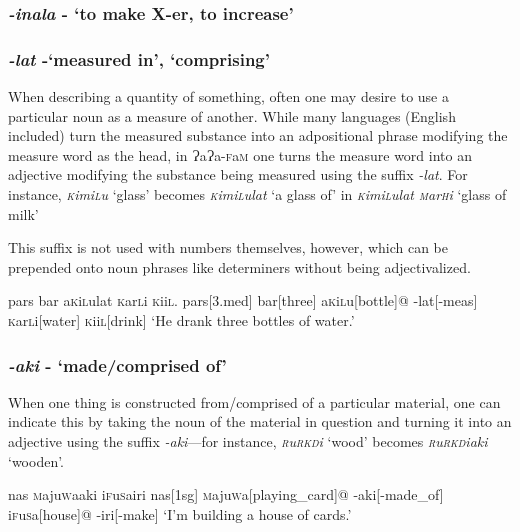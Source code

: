 \documentclass[a4paper,10pt,twoside,openright]{memoir}
\newcommand{\lang}{{\bigglot}a{\bigglot}a-\textsc{f}a\textsc{m}}
\newcommand{\bigglot}{Ɂ}
\newcommand{\famwordold}[5]{#1\textsc{#2}#3\textsc{#4}#5}
\begin{document}
\subsubsection{\emph{-inala} - `to make X-er, to increase'}

\subsubsection{\emph{-lat} -`measured in', `comprising'}

When describing a quantity of something, often one may desire to use a particular noun as a measure of another. While many languages (English included) turn the measured substance into an adpositional phrase modifying the measure word as the head, in \lang{} one turns the measure word into an adjective modifying the substance being measured using the suffix \emph{-lat}. For instance, \emph{\famwordold{}{k}{imi}{l}{u}} `glass' becomes \emph{\famwordold{}{k}{imi}{l}{ulat}} `a glass of' in \emph{\famwordold{}{k}{imi}{l}{ulat} \famwordold{}{m}{ar}{h}{i}} `glass of milk'

This suffix is not used with numbers themselves, however, which can be prepended onto noun phrases like determiners without being adjectivalized.

\ex
\begingl
\glpreamble
pars bar \famwordold{a}{k}{i}{l}{ulat} \famwordold{}{k}{ar}{l}{i} \famwordold{}{k}{ii}{l}{}.
\endpreamble
pars[\sc 3.med]
bar[three]
\famwordold{a}{k}{i}{l}{u}[bottle]@
-lat[\sc -meas]
\famwordold{}{k}{ar}{l}{i}[water]
\famwordold{}{k}{ii}{l}{}[drink]
\glft `He drank three bottles of water.'
\endgl
\xe

\subsubsection{\emph{-aki} - `made/comprised of'}

When one thing is constructed from/comprised of a particular material, one can indicate this by taking the noun of the material in question and turning it into an adjective using the suffix \emph{-aki}---for instance, \textit{\famwordold{}{r}{u}{rkd}{i}} `wood' becomes \textit{\famwordold{}{r}{u}{rkd}{iaki}} `wooden'. 

\ex
\begingl
\glpreamble%
nas \famwordold{}{m}{aju}{w}{aaki} \famwordold{i}{f}{u}{s}{airi}%
\endpreamble%
nas[\sc 1sg]
\famwordold{}{m}{aju}{w}{a}[playing\_card]@
-aki[-made\_of]
\famwordold{i}{f}{u}{s}{a}[house]@
-iri[-make]
\glft `I'm building a house of cards.'
\endgl
\xe
\end{document}
